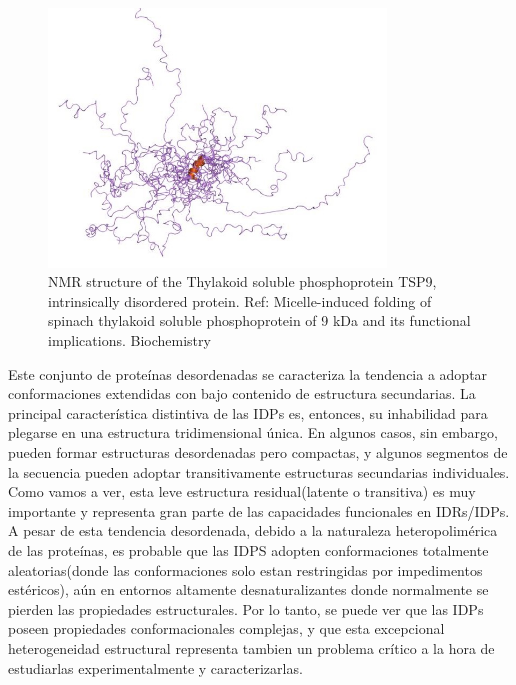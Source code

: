 \begin{figure}[h]
\centering
\includegraphics[width=0.8\textwidth]{img/idpExample-TSP9.jpg} 
\caption{NMR structure of the Thylakoid soluble phosphoprotein TSP9, intrinsically disordered protein. Ref:  Micelle-induced folding of spinach thylakoid soluble phosphoprotein of 9 kDa and its functional implications. Biochemistry} 
\label{idpExample}
\end{figure}





Este conjunto de proteínas desordenadas se caracteriza la tendencia a adoptar conformaciones extendidas con bajo contenido de estructura secundarias.
La principal característica distintiva de las IDPs es, entonces, su inhabilidad para plegarse en una estructura tridimensional única.
En algunos casos, sin embargo, pueden formar estructuras desordenadas pero compactas, y algunos segmentos de la secuencia pueden adoptar transitivamente estructuras secundarias individuales.
Como vamos a ver, esta leve estructura residual(latente o transitiva) es muy importante y representa gran parte de las capacidades funcionales en IDRs/IDPs.
A pesar de esta tendencia desordenada, debido a la naturaleza heteropolimérica de las proteínas, es probable que las IDPS adopten conformaciones totalmente aleatorias(donde las conformaciones solo estan restringidas por impedimentos estéricos),
aún en entornos altamente desnaturalizantes donde normalmente se pierden las propiedades estructurales.
Por lo tanto, se puede ver que las IDPs poseen propiedades conformacionales complejas, y que esta 
excepcional heterogeneidad estructural representa tambien un problema crítico a la hora de estudiarlas experimentalmente y caracterizarlas.




